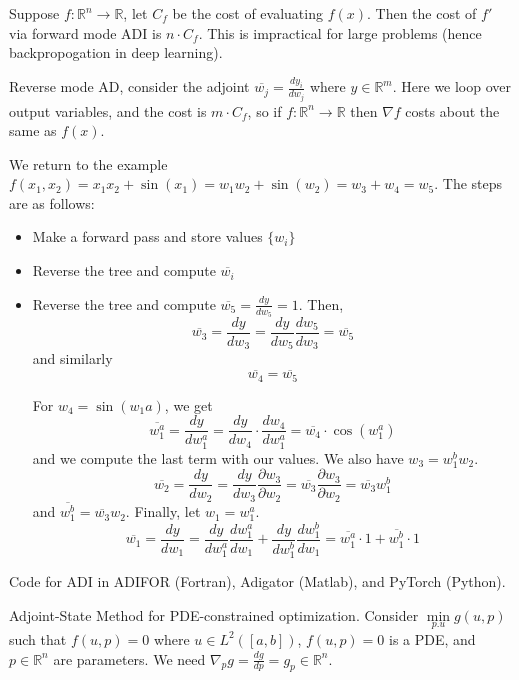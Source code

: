 \documentclass[english, 11pt]{article}
\begin{document}
\begin{enumerate}
\begin{rem} Suppose $f:\mathbb{R}^n \to \mathbb{R}$, let $C_f$ be the cost of evaluating $f(x)$. Then the cost of $f'$ via forward mode ADI is $n \cdot C_f$. This is impractical for large problems (hence backpropogation in deep learning).
\end{rem}

\begin{rem}
Reverse mode AD, consider the adjoint $\overline{w_j} = \frac{dy_i}{dw_j}$ where $y \in \mathbb{R}^m$. Here we loop over output variables, and the cost is $m \cdot C_f$, so if $f:\mathbb{R}^n \to \mathbb{R}$ then $\nabla f$ costs about the same as $f(x)$.
\end{rem}

\begin{exmp}
We return to the example $f(x_1,x_2) = x_1 x_2 + \sin (x_1) = w_1 w_2 + \sin (w_2) = w_3 + w_4 = w_5$. The steps are as follows:
\begin{itemize}
\item Make a forward pass and store values $\{w_i\}$
\item Reverse the tree and compute $\overline{w_i}$
\item Reverse the tree and compute $\overline{w_5}=\frac{dy}{dw_5} =1$. Then,
\[
\overline{w_3} = \frac{dy}{dw_3} = \frac{dy}{dw_5} \frac{dw_5}{dw_3} = \overline{w_5}
\]
and similarly
\[
\overline{w_4} = \overline{w_5}
\]

For $w_4 = \sin (w_1 a)$, we get
\[
\overline{w_1^a} = \frac{dy}{dw_1^a} = \frac{dy}{dw_4} \cdot \frac{dw_4}{dw_1^a} = \overline{w_4} \cdot \cos(w_1^a)
\]
and we compute the last term with our values. We also have $w_3 = w_1^b w_2$.
\[
\overline{w_2} = \frac{dy}{dw_2} = \frac{dy}{dw_3} \frac{\partial w_3}{\partial w_2} = \overline{w_3} \frac{\partial w_3}{\partial w_2} = \overline{w_3} w_1^b
\]
and $\overline{w_1^b} = \overline{w_3} w_2$. Finally, let $w_1 = w_1^a$.
\[
\overline{w_1} =  \frac{dy}{dw_1} = \frac{dy}{dw_1^a} \frac{dw_1^a}{dw_1} + \frac{dy}{dw_1^b} \frac{dw_1^b}{dw_1}
= \overline{w_1^a} \cdot 1 + \overline{w_1^b} \cdot 1
\]

\end{itemize}
\end{exmp}


\begin{rem}
Code for ADI in ADIFOR (Fortran), Adigator (Matlab), and PyTorch (Python).
\end{rem}

\begin{exmp}
Adjoint-State Method for PDE-constrained optimization. Consider $\min \limits_{p.u} g(u,p)$ such that $f(u,p)=0$ where $u \in L^2([a,b])$, $f(u,p)=0$ is a PDE, and $p \in \mathbb{R}^n$ are parameters. We need $\nabla_p g = \frac{dg}{dp} = g_p \in \mathbb{R}^n$.


\end{exmp}
\end{enumerate}
\end{document}
